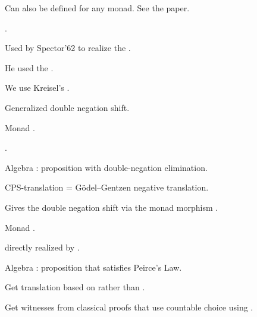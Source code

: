 \documentclass%
[%
Screen4to3,
]{foils}
\begin{document}

Can also be defined for any monad. See the paper.



.

\vfill


Used by Spector'62 to realize the .



\qquad He used the .

\qquad We use Kreisel's .


Generalized double negation shift.

\vfill

Monad .

\vfill

.

\vfill

Algebra : proposition  with
double-negation elimination.

\vfill

CPS-translation = G\"odel--Gentzen negative translation.


Gives the double negation shift via the monad morphism .

\vfill

Monad .

\vfill

directly realized by \darkblue{$\bigotimes$}.

\vfill

Algebra : proposition  that
satisfies Peirce's Law.

\vfill

Get translation based on  rather than .

\vfill

Get witnesses from classical proofs that use countable choice using
\darkblue{$\bigotimes$}. 

\end{document}
